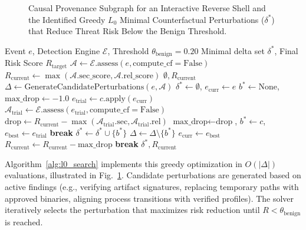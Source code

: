 \documentclass[conference]{IEEEtran}
\begin{document}
\begin{figure}[!t]
\centering

\caption{Causal Provenance Subgraph for an Interactive Reverse Shell and the Identified Greedy $L_0$ Minimal Counterfactual Perturbations ($\delta^*$) that Reduce Threat Risk Below the Benign Threshold.}
\label{fig:provenance_dag}
\end{figure}

\begin{algorithm}[t]
\caption{Greedy $L_0$ Counterfactual Search}
\label{alg:l0_search}
\begin{algorithmic}[1]
\REQUIRE Event $e$, Detection Engine $\mathcal{E}$, Threshold $\theta_{\text{benign}} = 0.20$
\ENSURE Minimal delta set $\delta^*$, Final Risk Score $R_{\text{target}}$
\STATE $\mathcal{A} \leftarrow \mathcal{E}.\text{assess}(e, \text{compute\_cf}=\text{False})$
\STATE $R_{\text{current}} \leftarrow \max(\mathcal{A}.\text{sec\_score}, \mathcal{A}.\text{rel\_score})$
    \RETURN $\emptyset, R_{\text{current}}$
\ENDIF
\STATE $\Delta \leftarrow \text{GenerateCandidatePerturbations}(e, \mathcal{A})$
\STATE $\delta^* \leftarrow \emptyset$, $e_{\text{curr}} \leftarrow e$
\WHILE{$\Delta \neq \emptyset$}
    \STATE $b^* \leftarrow \text{None}$, $\text{max\_drop} \leftarrow -1.0$
        \STATE $e_{\text{trial}} \leftarrow c.\text{apply}(e_{\text{curr}})$
        \STATE $\mathcal{A}_{\text{trial}} \leftarrow \mathcal{E}.\text{assess}(e_{\text{trial}}, \text{compute\_cf}=\text{False})$
        \STATE $\text{drop} \leftarrow R_{\text{current}} - \max(\mathcal{A}_{\text{trial}}.\text{sec}, \mathcal{A}_{\text{trial}}.\text{rel})$
            \STATE $\text{max\_drop} \leftarrow \text{drop}$, $b^* \leftarrow c$, $e_{\text{best}} \leftarrow e_{\text{trial}}$
        \ENDIF
    \ENDFOR
     \textbf{break} \ENDIF
    \STATE $\delta^* \leftarrow \delta^* \cup \{b^*\}$
    \STATE $\Delta \leftarrow \Delta \setminus \{b^*\}$
    \STATE $e_{\text{curr}} \leftarrow e_{\text{best}}$
    \STATE $R_{\text{current}} \leftarrow R_{\text{current}} - \text{max\_drop}$
     \textbf{break} \ENDIF
\ENDWHILE
\RETURN $\delta^*, R_{\text{current}}$
\end{algorithmic}
\end{algorithm}

Algorithm~\ref{alg:l0_search} implements this greedy optimization in $O(|\Delta|)$ evaluations, illustrated in Fig.~\ref{fig:provenance_dag}. Candidate perturbations are generated based on active findings (e.g., verifying artifact signatures, replacing temporary paths with approved binaries, aligning process transitions with verified profiles). The solver iteratively selects the perturbation that maximizes risk reduction until $R < \theta_{\text{benign}}$ is reached.
\end{document}
